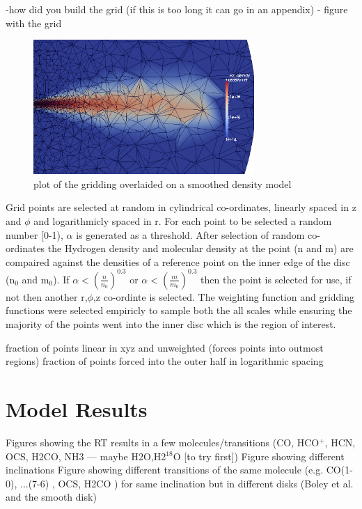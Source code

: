 \documentclass[useAMS,usenatbib]{mn2e}
\begin{document}
-how did you build the grid  (if this is too long it can go in an appendix)  - figure with the grid

\begin{figure}
 \includegraphics[width=84mm]{Figures/model/Lime_grid3.png}

 \caption{plot of the gridding overlaided on a smoothed density model}
\end{figure}
Grid points are selected at random in cylindrical co-ordinates, linearly spaced in z and $\phi$ and logarithmicly spaced in r. For each point to be selected a random number [0-1), $\alpha$ is generated as a threshold. After selection of random co-ordinates the Hydrogen density and molecular density at the point (n and m) are compaired against the densities of a reference point on the inner edge of the disc (n$_0$ and m$_0$). If $\alpha<\left( \frac{n}{n_0} \right)^{0.3}$ or $\alpha< \left( \frac{m}{m_0} \right)^{0.3}$ then the point is selected for use, if not then another r,$\phi$,z co-ordinte is selected. The weighting function and gridding functions were selected empiricly to sample both the all scales while ensuring the majority of the points went into the inner disc which is the region of interest.


fraction of points linear in xyz and unweighted (forces points into outmost regions)
fraction of points forced into the outer half in logarithmic spacing



\section{Model Results}

Figures showing the RT results in a few molecules/transitions (CO, HCO$^+$, HCN, OCS, H2CO, NH3 --- maybe H2O,H2$^{18}$O [to try first])  
Figure showing different inclinations  
Figure showing different transitions of the same molecule (e.g. CO(1-0), ...(7-6) , OCS,  H2CO ) for same inclination but in different disks (Boley et al. and the smooth disk)
\end{document}
